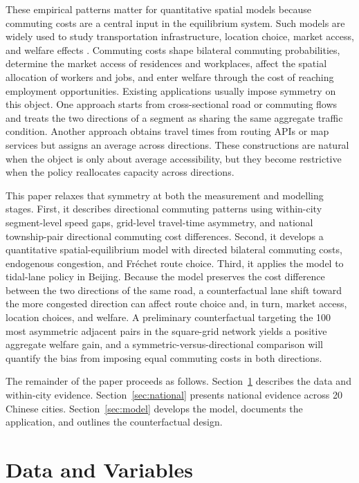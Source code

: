 \documentclass[12pt]{article}
\begin{document}
These empirical patterns matter for quantitative spatial models because commuting costs are a central input in the equilibrium system. Such models are widely used to study transportation infrastructure, location choice, market access, and welfare effects \citep{AllenArkolakis2014,Ahlfeldt2015,ReddingRossiHansberg2017}. Commuting costs shape bilateral commuting probabilities, determine the market access of residences and workplaces, affect the spatial allocation of workers and jobs, and enter welfare through the cost of reaching employment opportunities. Existing applications usually impose symmetry on this object. One approach starts from cross-sectional road or commuting flows and treats the two directions of a segment as sharing the same aggregate traffic condition. Another approach obtains travel times from routing APIs or map services but assigns an average across directions. These constructions are natural when the object is only about average accessibility, but they become restrictive when the policy reallocates capacity across directions.

This paper relaxes that symmetry at both the measurement and modelling stages. First, it describes directional commuting patterns using within-city segment-level speed gaps, grid-level travel-time asymmetry, and national township-pair directional commuting cost differences. Second, it develops a quantitative spatial-equilibrium model with directed bilateral commuting costs, endogenous congestion, and Fr\'{e}chet route choice. Third, it applies the model to tidal-lane policy in Beijing. Because the model preserves the cost difference between the two directions of the same road, a counterfactual lane shift toward the more congested direction can affect route choice and, in turn, market access, location choices, and welfare. A preliminary counterfactual targeting the 100 most asymmetric adjacent pairs in the square-grid network yields a positive aggregate welfare gain, and a symmetric-versus-directional comparison will quantify the bias from imposing equal commuting costs in both directions.

The remainder of the paper proceeds as follows. Section~\ref{sec:data} describes the data and within-city evidence. Section~\ref{sec:national} presents national evidence across 20 Chinese cities. Section~\ref{sec:model} develops the model, documents the application, and outlines the counterfactual design.

\section{Data and Variables}
\label{sec:data}
\end{document}

